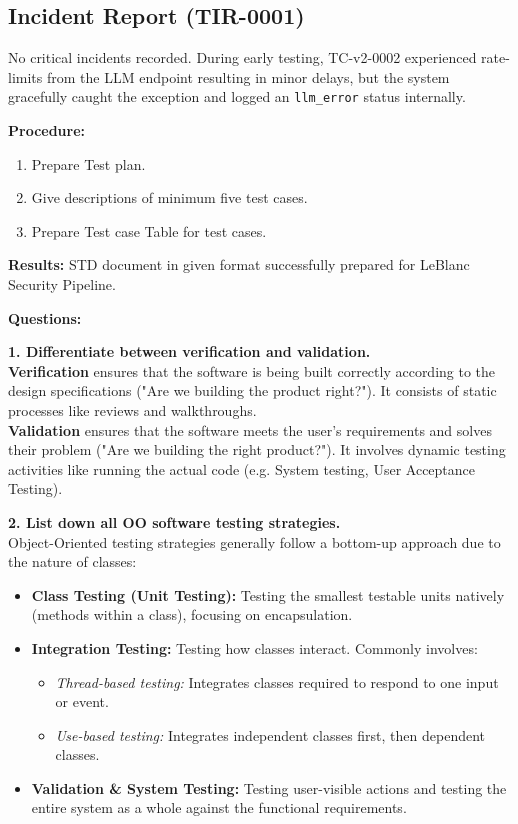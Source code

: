 \documentclass[12pt, a4paper]{article}
\begin{document}
\subsection{Incident Report (TIR-0001)}
No critical incidents recorded. During early testing, TC-v2-0002 experienced rate-limits from the LLM endpoint resulting in minor delays, but the system gracefully caught the exception and logged an \texttt{llm\_error} status internally.

\hrulefill

\vspace{0.5cm}
\noindent \textbf{Procedure:} 
\begin{enumerate}
    \item Prepare Test plan.
    \item Give descriptions of minimum five test cases.
    \item Prepare Test case Table for test cases.
\end{enumerate}

\vspace{0.5cm}
\noindent \textbf{Results:} STD document in given format successfully prepared for LeBlanc Security Pipeline.

\vspace{1cm}
\noindent \textbf{Questions:}

\noindent \textbf{1. Differentiate between verification and validation.} \\
\textbf{Verification} ensures that the software is being built correctly according to the design specifications ("Are we building the product right?"). It consists of static processes like reviews and walkthroughs. \\
\textbf{Validation} ensures that the software meets the user's requirements and solves their problem ("Are we building the right product?"). It involves dynamic testing activities like running the actual code (e.g. System testing, User Acceptance Testing).

\vspace{0.5cm}
\noindent \textbf{2. List down all OO software testing strategies.} \\
Object-Oriented testing strategies generally follow a bottom-up approach due to the nature of classes:
\begin{itemize}
    \item \textbf{Class Testing (Unit Testing):} Testing the smallest testable units natively (methods within a class), focusing on encapsulation.
    \item \textbf{Integration Testing:} Testing how classes interact. Commonly involves:
    \begin{itemize}
        \item \textit{Thread-based testing:} Integrates classes required to respond to one input or event.
        \item \textit{Use-based testing:} Integrates independent classes first, then dependent classes.
    \end{itemize}
    \item \textbf{Validation \& System Testing:} Testing user-visible actions and testing the entire system as a whole against the functional requirements.
\end{itemize}
\end{document}
